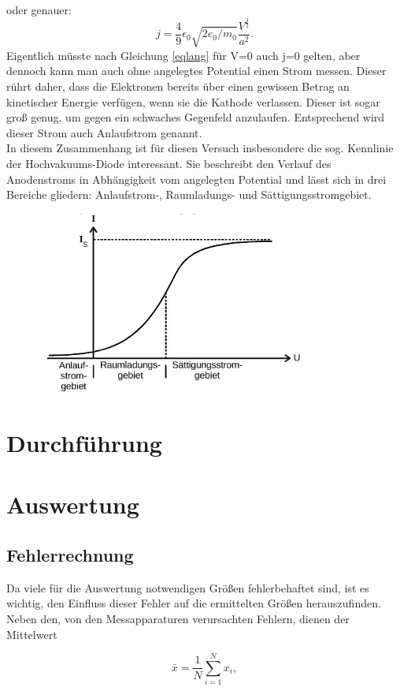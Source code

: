 oder genauer:
\begin{equation}
j=\frac{4}{9}\epsilon_0 \sqrt{2e_0/m_0} \frac{V^\frac{3}{2}}{a^2}.
\label{eqlang}
\end{equation}
Eigentlich müsste nach Gleichung \eqref{eqlang} für V=0 auch j=0 gelten, aber dennoch kann man auch ohne angelegtes Potential einen Strom messen. Dieser rührt daher, dass  die Elektronen bereits über einen gewissen Betrag an kinetischer Energie verfügen, wenn sie die Kathode verlassen. Dieser ist sogar groß genug, um gegen ein schwaches Gegenfeld anzulaufen. Entsprechend wird dieser Strom auch Anlaufstrom genannt.\\
In diesem Zusammenhang ist für diesen Versuch insbesondere die sog. Kennlinie der Hochvakuums-Diode interessant. Sie beschreibt den Verlauf des Anodenstroms in Abhängigkeit vom angelegten Potential und lässt sich in drei Bereiche gliedern:  Anlaufstrom-, Raumladungs- und Sättigungsstromgebiet.

\begin{figure}[H]
\includegraphics[width=0.8\textwidth]{pics/kennlinie.jpg}
\label{pic_kennlinie}
\end{figure}



\section{Durchführung}









\section{Auswertung}
\subsection{Fehlerrechnung}
Da viele für die Auswertung notwendigen Größen fehlerbehaftet sind, ist es wichtig, den Einfluss dieser Fehler auf die ermittelten
Größen herauszufinden. Neben den, von den Messapparaturen verursachten Fehlern, dienen der Mittelwert
\begin{formel}
\begin{equation}
 \bar{x} = \frac1N \sum_{i=1}^{N} x_i,
\end{equation}
\caption*{\small{$\bar{x}$ = Mittelwert, N = Anzahl der Messungen}}
\end{formel}

